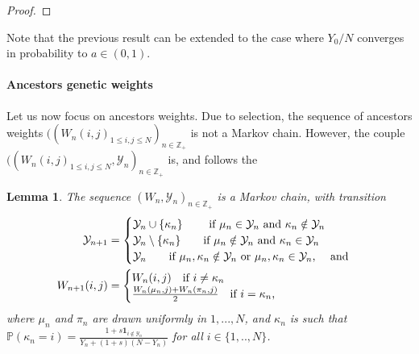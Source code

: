 \documentclass[11pt]{article}
\newtheorem{lemma}[theorem]{Lemma}
\theoremstyle{remark}
\numberwithin{equation}{section}
\begin{document}
\begin{proof}
\end{proof}
Note that the previous result can be extended to the case where $Y_0/N$ converges in probability to $a\in(0,1)$.

\bigskip
\paragraph*{Ancestors genetic weights} Let us now focus on ancestors weights. Due to selection, the sequence of ancestors weights $((W_n(i,j)_{1\leq i,j\leq N})_{n\in\mathbb{Z}_+}$ is not a Markov chain. However, the couple $((W_n(i,j)_{1\leq i,j\leq N},\mathcal{Y}_n)_{n\in\mathbb{Z}_+}$ is, and follows the


\begin{lemma}\label{prop-WY}
The sequence $(W_n,\mathcal{Y}_n)_{n\in\mathbb{Z}_+}$ is a Markov chain, with transition \begin{align}\mathcal{Y}_{n+1}&=\begin{cases}
  \mathcal{Y}_n\cup\{\kappa_n\} \qquad \text{ if $\mu_n\in\mathcal{Y}_n$ and  $\kappa_n\notin\mathcal{Y}_n$ } \\
  \mathcal{Y}_n\setminus\{\kappa_n\}\qquad \text{if $\mu_n\notin\mathcal{Y}_n$ and $\kappa_n\in\mathcal{Y}_n$}\\
  \mathcal{Y}_n \qquad \text{if $\mu_n,\kappa_n\notin\mathcal{Y}_n$ or $\mu_n,\kappa_n\in\mathcal{Y}_n$, \quad and}
\end{cases}\label{eq-Y}\\
W_{n+1}(i,j)&=\begin{cases}W_n(i,j) \quad\text{if $i\neq \kappa_n$}\\
    \frac{W_n(\mu_n,j)+W_n(\pi_n,j)}{2} \quad\text{if $i=\kappa_n$,}\end{cases}\label{eq-W}\end{align} where $\mu_n$ and $\pi_n$ are drawn uniformly in $1,...,N$, and $\kappa_n$ is such that $\mathbb{P}(\kappa_n=i)=\frac{1+s\mathbf{1}_{i\notin\mathcal{Y}_n}}{Y_n+(1+s)(N-Y_n)}$ for all $i\in\{1,..,N\}$.
\end{lemma}
\end{document}
